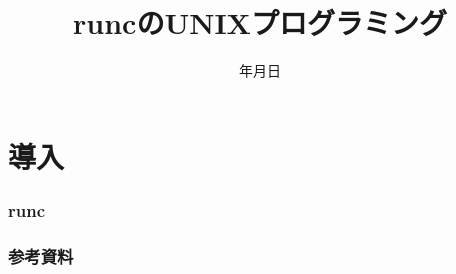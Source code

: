 \documentclass[unicode, 14pt, aspectratio=169]{beamer}
\date{\number\year 年\number\month 月\number\day 日}
\title{runcのUNIXプログラミング}
\begin{document}
\begin{frame}
\titlepage
\end{frame}
\section{導入}
\begin{frame}[t]
  \frametitle{runc}
\end{frame}
\begin{frame}[allowframebreaks,t]
  \frametitle{参考資料}  
  \printbibliography
\end{frame}
\end{document}
